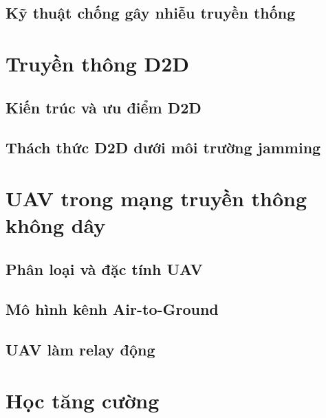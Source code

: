 \subsection{Kỹ thuật chống gây nhiễu truyền thống}
\label{subsec:bg:antijamming:traditional}

\section{Truyền thông D2D}
\label{sec:bg:d2d}

\subsection{Kiến trúc và ưu điểm D2D}
\label{subsec:bg:d2d:arch}

\subsection{Thách thức D2D dưới môi trường jamming}
\label{subsec:bg:d2d:challenge}

\section{UAV trong mạng truyền thông không dây}
\label{sec:bg:uav}

\subsection{Phân loại và đặc tính UAV}
\label{subsec:bg:uav:classification}

\subsection{Mô hình kênh Air-to-Ground}
\label{subsec:bg:uav:channel}

\subsection{UAV làm relay động}
\label{subsec:bg:uav:relay}

\section{Học tăng cường}
\label{sec:bg:rl}


